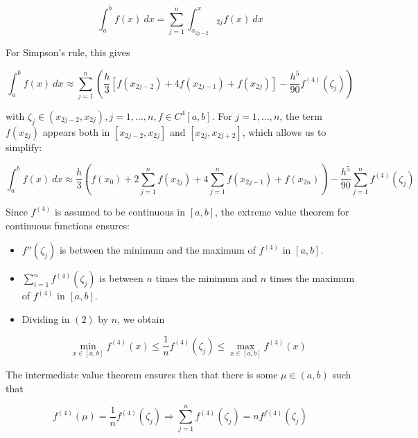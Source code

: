 \documentclass[12pt]{article}
\theoremstyle{definition}
\begin{document}
\begin{equation*}
    \int_a^b f(x) ~ dx = \sum_{j=1}^n \int_{x_{2j-2}}^x_{2j} f(x) ~ dx
\end{equation*}

For Simpson's rule, this gives 

\begin{equation*}
    \int_a^b f(x) ~ dx \approx \sum_{j=1}^n \left( \frac{h}{3}\left[ f(x_{2j
    -2}) + 4f(x_{2j - 1}) + f(x_{2j}) \right] - \frac{h^5}{90}f^{(4)}(\zeta_j)  \right) 
\end{equation*}

with $\zeta_j \in (x_{2j-2}, x_{2j}), j = 1, \ldots, n, f \in C^4[a, b]$.
For $j = 1, \ldots, n$, the term $f(x_{2j})$ appears both in 
$[x_{2j-2}, x_{2j}]$ and $[x_{2j}, x_{2j+2}]$, which allows us to simplify:


\begin{equation*}
    \int_a^b f(x) ~ dx \approx \frac{h}{3} \left( f(x_0) + 2 \sum_{j=1}^n
    f(x_{2j}) + 4 \sum_{j=1}^n f(x_{2j - 1}) + f(x_{2n}) \right) -
    \frac{h^5}{90}\sum_{j=1}^n f^{(4)} (\zeta_j)
\end{equation*}



Since $f^{(4)}$ is assumed to be continuous in $[a, b]$, the extreme value
theorem for continuous functions ensures:

\begin{itemize}
    \item $f''(\zeta_j)$ is between the minimum and the maximum of $f^{(4)}$ 
        in $[a, b]$.
    \item $\sum_{i=1}^n f^{(4)} (\zeta_j)$ is between $n$ times the minimum and
        $n$ times the maximum of $f^{(4)}$ in $[a, b]$.
    \item Dividing in $(2)$ by $n$, we obtain 

        \begin{equation*}
            \min_{x \in [a, b]} f^{(4)}(x) \leq \frac{1}{n} f^{(4)}(\zeta_j)
            \leq \max_{x \in [a,b]} f^{(4)}(x)
        \end{equation*}
\end{itemize}

The intermediate value theorem ensures then that there is some $\mu \in (a, b)$ such that 

\begin{equation*}
    f^{(4)}(\mu) = \frac{1}{n} f^{(4)}(\zeta_j) \Rightarrow \sum_{j=1}^n
    f^{(4)}(\zeta_j) = n f^{f(4)}(\zeta_j)
\end{equation*}
\end{document}
